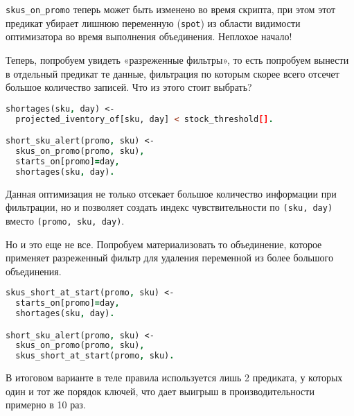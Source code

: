 \lstinline{skus_on_promo} теперь может быть изменено во время скрипта, при этом этот предикат убирает лишнюю переменную (\lstinline{spot}) из области видимости оптимизатора во время выполнения объединения. Неплохое начало!

Теперь, попробуем увидеть «разреженные фильтры», то есть попробуем вынести в отдельный предикат те данные, фильтрация по которым скорее всего отсечет большое количество записей. Что из этого стоит выбрать?

\begin{lstlisting}[language=Prolog]
shortages(sku, day) <-
  projected_iventory_of[sku, day] < stock_threshold[].

short_sku_alert(promo, sku) <-
  skus_on_promo(promo, sku),
  starts_on[promo]=day,
  shortages(sku, day).
\end{lstlisting}

Данная оптимизация не только отсекает большое количество информации при фильтрации, но и позволяет создать индекс чувствительности по \lstinline{(sku, day)} вместо \lstinline{(promo, sku, day)}.

Но и это еще не все. Попробуем материализовать то объединение, которое применяет разреженный фильтр для удаления переменной из более большого объединения.

\begin{lstlisting}[language=Prolog]
skus_short_at_start(promo, sku) <-
  starts_on[promo]=day,
  shortages(sku, day).

short_sku_alert(promo, sku) <-
  skus_on_promo(promo, sku),
  skus_short_at_start(promo, sku).
\end{lstlisting}

В итоговом варианте в теле правила используется лишь 2 предиката, у которых один и тот же порядок ключей, что дает выигрыш в производительности примерно в 10 раз.
